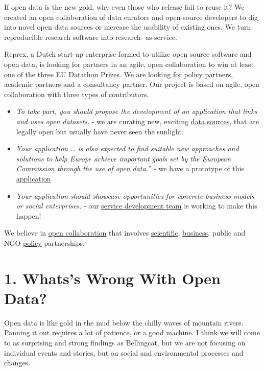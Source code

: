 \documentclass[
  a4paper,
  openany, a4paper, oneside]{book}
\begin{document}
If open data is the new gold, why even those who release fail to reuse it? We created an open collaboration of data curators and open-source developers to dig into novel open data sources or increase the usability of existing ones. We turn reproducible research software into research- as-service.

Reprex, a Dutch start-up enterprise formed to utilize open source software and open data, is looking for partners in an agile, open collaboration to win at least one of the three EU Datathon Prizes. We are looking for policy partners, academic partners and a consultancy partner. Our project is based on agile, open collaboration with three types of contributors.

\begin{itemize}
\item
  \emph{To take part, you should propose the development of an application that links and uses open datasets.} - we are curating new, exciting \protect\hyperlink{data-domains}{data sources}, that are legally open but usually have never seen the sunlight.
\item
  \emph{Your application \ldots{} is also expected to find suitable new approaches and solutions to help Europe achieve important goals set by the European Commission through the use of open data.}'' - we have a prototype of this \protect\hyperlink{tech-solution}{application}
\item
  \emph{Your application should showcase opportunities for concrete business models or social enterprises.} - our \protect\hyperlink{business-solution}{service development team} is working to make this happen!
\end{itemize}

We believe in \href{}{open collaboration} that involves \protect\hyperlink{intro-academic-partners}{scientific}, \protect\hyperlink{intro-business-partners}{business}, public and NGO \protect\hyperlink{intro-policy-partners}{policy} partnerships.

\hypertarget{whatss-wrong-with-open-data}{%
\section*{1. Whats's Wrong With Open Data?}\label{whatss-wrong-with-open-data}}

Open data is like gold in the mud below the chilly waves of mountain rivers. Panning it out requires a lot of patience, or a good machine. I think we will come to as surprising and strong findings as Bellingcat, but we are not focusing on individual events and stories, but on social and environmental processes and changes.
\end{document}
